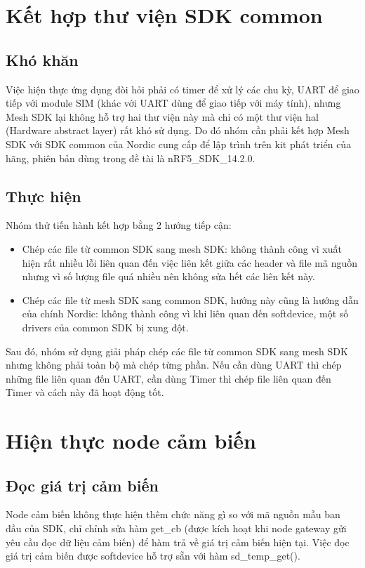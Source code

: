     \section{Kết hợp thư viện SDK common}
        \subsection{Khó khăn}
        Việc hiện thực ứng dụng đòi hỏi phải có timer để xử lý các chu kỳ, UART để giao tiếp với module SIM (khác với UART dùng để giao tiếp với máy tính), nhưng Mesh SDK lại không hỗ trợ hai thư viện này mà chỉ có một thư viện hal (Hardware abstract layer) rất khó sử dụng. Do đó nhóm cần phải kết hợp Mesh SDK với SDK common của Nordic cung cấp để lập trình trên kit phát triển của hãng, phiên bản dùng trong đề tài là nRF5\_SDK\_14.2.0\cite{nrf5sdk}.
        \subsection{Thực hiện}
        Nhóm thử tiến hành kết hợp bằng 2 hướng tiếp cận:
        \begin{itemize}
            \item Chép các file từ common SDK sang mesh SDK: không thành công vì xuất hiện rất nhiều lỗi liên quan đến việc liên kết giữa các header và file mã nguồn nhưng vì số lượng file quá nhiều nên không sửa hết các liên kết này.
            \item Chép các file từ mesh SDK sang common SDK, hướng này cũng là hướng dẫn của chính Nordic: không thành công vì khi liên quan đến softdevice, một số drivers của common SDK bị xung đột.
        \end{itemize}
        Sau đó, nhóm sử dụng giải pháp chép các file từ common SDK sang mesh SDK nhưng không phải toàn bộ mà chép từng phần. Nếu cần dùng UART thì chép những file liên quan đến UART, cần dùng Timer thì chép file liên quan đến Timer và cách này đã hoạt động tốt.
    \section{Hiện thực node cảm biến}
        \subsection{Đọc giá trị cảm biến}
        Node cảm biến không thực hiện thêm chức năng gì so với mã nguồn mẫu ban đầu của SDK, chỉ chỉnh sửa hàm get\_cb (được kích hoạt khi node gateway gửi yêu cầu đọc dữ liệu cảm biến) để hàm trả về giá trị cảm biến hiện tại. Việc đọc giá trị cảm biến được softdevice hỗ trợ sẵn với hàm sd\_temp\_get().
